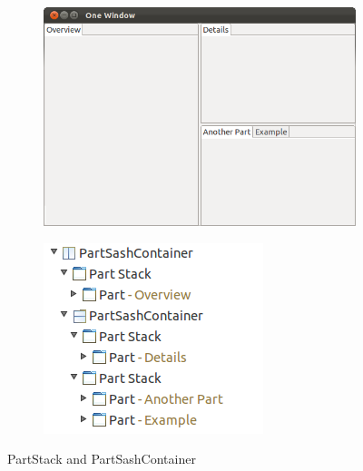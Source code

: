 \begin{figure}[h]
	\centering
	\begin{subfigure}[b]{0.55\textwidth}
		\includegraphics[width=\textwidth]{./image/e4_006}
	\end{subfigure}
	\begin{subfigure}[b]{0.4\textwidth}
		\includegraphics[width=\textwidth]{./image/e4_007}
	\end{subfigure}
	\captionsetup{justification=centering}
	\caption{PartStack and PartSashContainer}
	\label{fig:6}       %
\end{figure}

